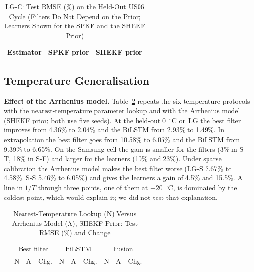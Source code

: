 \documentclass[journal]{IEEEtran}
\begin{document}
\begin{table}[!t]
\caption{LG-C: Test RMSE (\%) on the Held-Out US06 Cycle (Filters Do Not Depend on the Prior; Learners Shown for the SPKF and the SHEKF Prior)}
\label{tab:lcyc}
\centering\scriptsize
\begin{tabular}{@{}lcc@{}}
\toprule
Estimator & SPKF prior & SHEKF prior\\
\midrule

\end{tabular}
\end{table}

\subsection{Temperature Generalisation}\label{sec:temp}
\textbf{Effect of the Arrhenius model.} Table~\ref{tab:ecmabl} repeats the six temperature protocols with the nearest-temperature parameter lookup and with the Arrhenius model (SHEKF prior; both use five seeds). At the held-out $0$~$^\circ$C on LG the best filter improves from 4.36\% to 2.04\% and the BiLSTM from 2.93\% to 1.49\%. In extrapolation the best filter goes from 10.58\% to 6.05\% and the BiLSTM from 9.39\% to 6.65\%. On the Samsung cell the gain is smaller for the filters (3\% in S-T, 18\% in S-E) and larger for the learners (10\% and 23\%). Under sparse calibration the Arrhenius model makes the best filter worse (LG-S 3.67\% to 4.58\%, S-S 5.46\% to 6.05\%) and gives the learners a gain of 4.5\% and 15.5\%. A line in $1/T$ through three points, one of them at $-20$~$^\circ$C, is dominated by the coldest point, which would explain it; we did not test that explanation.

\begin{table}[!t]
\caption{Nearest-Temperature Lookup (N) Versus Arrhenius Model (A), SHEKF Prior: Test RMSE (\%) and Change}
\label{tab:ecmabl}
\centering\scriptsize
\setlength{\tabcolsep}{2.2pt}
\begin{tabular}{@{}lccccccccc@{}}
\toprule
 & \multicolumn{3}{c}{Best filter} & \multicolumn{3}{c}{BiLSTM} & \multicolumn{3}{c}{Fusion}\\
 & N & A & Chg. & N & A & Chg. & N & A & Chg.\\
\midrule

\end{tabular}
\end{table}
\end{document}
